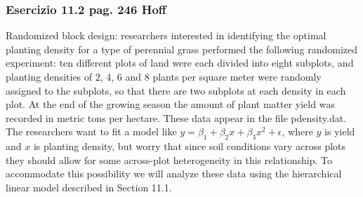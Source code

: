 \subsubsection*{Esercizio 11.2 pag. 246 Hoff}

Randomized block design: researchers interested in identifying the optimal planting density for
a type of perennial grass performed the following randomized experiment: ten different plots of
land were each divided into eight subplots, and planting densities of 2, 4, 6 and 8 plants per
square meter were randomly assigned to the subplots, so that there are two subplots at each
density in each plot. At the end of the growing season the amount of plant matter yield was
recorded in metric tons per hectare. These data appear in the file pdensity.dat. The researchers
want to fit a model like $y = \beta_1 + \beta_2 x + \beta_3 x^2 + \epsilon$, where $y$ is yield and $x$ is planting density,
but worry that since soil conditions vary across plots they should allow for some across-plot
heterogeneity in this relationship. To accommodate this possibility we will analyze these data
using the hierarchical linear model described in Section 11.1.

